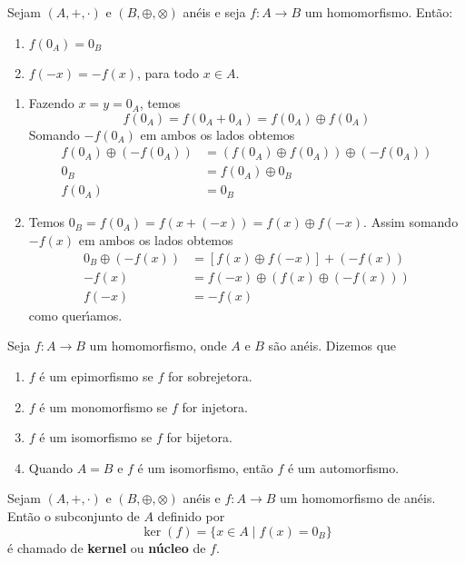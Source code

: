 \begin{proposicao}
	Sejam $(A, +, \cdot)$ e $(B, \oplus, \otimes)$ an\'eis e seja $f : A \to B$ um homomorfismo. Ent{\~a}o:
	\begin{enumerate}[label={\roman*})]
		\item $f(0_{A}) = 0_{B}$
		\item $f(-x) = -f(x)$, para todo $x \in A$.
	\end{enumerate}
\end{proposicao}
\begin{prova}
	\begin{enumerate}[label={\roman*})]
		\item Fazendo $x = y = 0_{A}$, temos
		\[
			f(0_A) = f(0_A + 0_A) = f(0_A) \oplus f(0_A)
		\]
		Somando $-f(0_A)$ em ambos os lados obtemos
		\begin{align*}
			f(0_A) \oplus (-f(0_A)) &= (f(0_A)\oplus f(0_A)) \oplus (-f(0_A))\\
			0_B &= f(0_A) \oplus 0_B\\
			f(0_A) &= 0_B
		\end{align*}

		\item Temos $0_B = f(0_A) = f(x + (-x)) = f(x)\oplus f(-x)$. Assim somando $-f(x)$ em ambos os lados obtemos
		\begin{align*}
			0_B\oplus(-f(x)) &= [f(x)\oplus f(-x)] + (-f(x))\\
			-f(x) &= f(-x) \oplus (f(x) \oplus (-f(x)))\\
			f(-x) &= -f(x)
		\end{align*}
		como quer{\'\i}amos.
	\end{enumerate}
\end{prova}

\begin{definicao}Seja $f:A\rightarrow B$ um homomorfismo, onde $A$ e $B$ s{\~a}o an{\'e}is. Dizemos que
	\begin{enumerate}[label={\roman*})]
		\item $f$ {\'e} um epimorfismo se $f$ for sobrejetora.
		\item $f$ {\'e} um monomorfismo se $f$ for injetora.
		\item $f$ {\'e} um isomorfismo se $f$ for bijetora.
		\item Quando $A=B$ e $f$ {\'e} um isomorfismo, ent{\~a}o $f$ {\'e} um automorfismo.
	\end{enumerate}
\end{definicao}

\begin{definicao}
	Sejam $(A, +, \cdot)$ e $(B, \oplus, \otimes)$ an\'eis e $f : A \to B$ um homomorfismo de an\'eis. Ent\~ao o subconjunto de $A$ definido por
	\[
		\ker(f) = \{ x \in A \mid f(x) = 0_B\}
	\]
	\'e chamado de \textbf{kernel} ou \textbf{n\'ucleo} de $f$.
\end{definicao}

